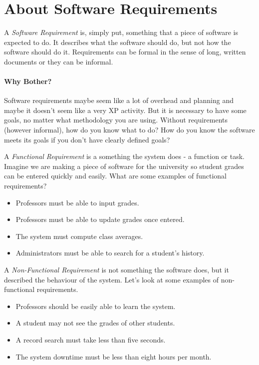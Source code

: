 




\section*{About Software Requirements}

A \textit{Software Requirement} is, simply put, something that a piece of software is expected to do. It describes what the software should do, but not how the software should do it. Requirements can be formal in the sense of long, written documents or they can be informal.

\paragraph{Why Bother?} Software requirements maybe seem like a lot of overhead and planning and maybe it doesn't seem like a very XP activity. But it is necessary to have some goals, no matter what methodology you are using. Without requirements (however informal), how do you know what to do? How do you know the software meets its goals if you don't have clearly defined goals?

A \textit{Functional Requirement} is a something the system does - a function or task. Imagine we are making a piece of software for the university so student grades can be entered quickly and easily. What are some examples of functional requirements?

\begin{itemize}
	\item Professors must be able to input grades.
	\item Professors must be able to update grades once entered.
	\item The system must compute class averages.
	\item Administrators must be able to search for a student's history.
\end{itemize}

A \textit{Non-Functional Requirement} is not something the software does, but it described the behaviour of the system. Let's look at some examples of non-functional requirements.

\begin{itemize}
	\item Professors should be easily able to learn the system.
	\item A student may not see the grades of other students.
	\item A record search must take less than five seconds.
	\item The system downtime must be less than eight hours per month.
\end{itemize}

